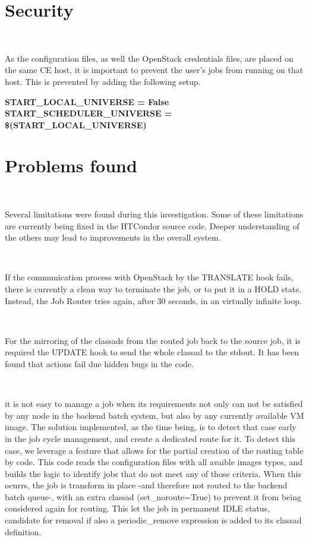 \documentclass[a4paper]{jpconf}
\begin{document}
\section{Security}

~

As the configuration files, as well the OpenStack credentials files, 
are placed on the same CE host, it is important to prevent the user's jobs from running on that host.
This is prevented by adding the following setup.

\begin{center}
    \colorbox{htcondorbox}{
        \begin{minipage}{\textwidth}
        \small
            \bf{START\_LOCAL\_UNIVERSE = False \newline
                START\_SCHEDULER\_UNIVERSE = \$(START\_LOCAL\_UNIVERSE)
            }
        \end{minipage}
    }
\end{center}


\section{Problems found}

~

Several limitations were found during this investigation.
Some of these limitations are currently being fixed in the HTCondor source code.
Deeper understanding of the others may lead to improvements in the overall system.

~

If the communication process with OpenStack by the TRANSLATE hook fails, 
there is currently a clean way to terminate the job, or to put it in a HOLD state.
Instead, the Job Router tries again, after 30 seconds, in an virtually infinite loop. 

~

For the mirroring of the classads from the routed job back to the source job, 
it is required the UPDATE hook to send the whole classad to the stdout. 
It has been found that actions fail due hidden bugs in the code. 

~

it is not easy to manage a job when its requirements 
not only can not be satisfied by any node in the backend batch system, 
but also by any currently available VM image. 
The solution implemented, as the time being, is to detect that case early in the job cycle management, 
and create a dedicated route for it. 
To detect this case, we leverage a feature that allows for the partial creation of the routing table by code.
This code reads the configuration files with all avaible images types, and builds the logic to identify jobs that do not meet any of those criteria. 
When this ocurrs, the job is transform in place -and therefore not routed to the backend batch queue-,
with an extra classad (set\_noroute=True) to prevent it from being considered again for routing.
This let the job in permanent IDLE status, candidate for removal if also a periodic\_remove expression is added to its classad definition.
\end{document}
